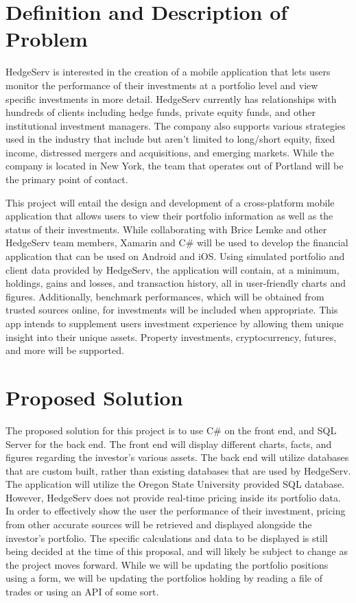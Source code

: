 \documentclass[onecolumn, draftclsnofoot,10pt, compsoc]{IEEEtran}
\begin{document}
\newpage
{}
\tableofcontents
\clearpage

\section{Definition and Description of Problem}

HedgeServ is interested in the creation of a mobile application that lets users monitor the performance of their investments at a portfolio level and view specific investments in more detail. HedgeServ currently has relationships with hundreds of clients including hedge funds, private equity funds, and other institutional investment managers. The company also supports various strategies used in the industry that include but aren’t limited to long/short equity, fixed income, distressed mergers and acquisitions, and emerging markets. While the company is located in New York, the team that operates out of Portland will be the primary point of contact.

This project will entail the design and development of a cross-platform mobile application that allows users to view their portfolio information as well as the status of their investments. While collaborating with Brice Lemke and other HedgeServ team members, Xamarin and C\# will be used to develop the financial application that can be used on Android and iOS. Using simulated portfolio and client data provided by HedgeServ, the application will contain, at a minimum, holdings, gains and losses, and transaction history, all in user-friendly charts and figures. Additionally, benchmark performances, which will be obtained from trusted sources online, for investments will be included when appropriate. This app intends to supplement users investment experience by allowing them unique insight into their unique assets. Property investments, cryptocurrency, futures, and more will be supported.

\section{Proposed Solution}
The proposed solution for this project is to use C\# on the front end, and SQL Server for the back end. The front end will display different charts, facts, and figures regarding the investor’s various assets. The back end will utilize databases that are custom built, rather than existing databases that are used by HedgeServ. The application will utilize the Oregon State University provided SQL database. However, HedgeServ does not provide real-time pricing inside its portfolio data. In order to effectively show the user the performance of their investment, pricing from other accurate sources will be retrieved and displayed alongside the investor’s portfolio. The specific calculations and data to be displayed is still being decided at the time of this proposal, and will likely be subject to change as the project moves forward. While we will be updating the portfolio positions using a form, we will be updating the portfolios holding by reading a file of trades or using an API of some sort.
\end{document}
